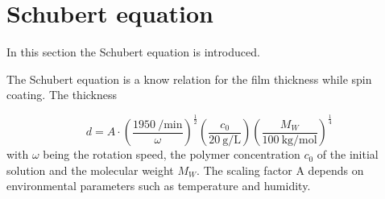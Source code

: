 \section{Schubert equation}
\label{sec:Schubert}

In this section the Schubert equation is introduced. 

The Schubert equation is a know relation for the film thickness while spin coating. The thickness 

\begin{equation}
    d = A \cdot (\frac{\SI{1950}{\per\minute}}{\omega})^\frac{1}{2} (\frac{c_0}{\SI{20}{\gram\per\liter}})(\frac{M_W}{\SI{100}{\kilo\gram\per \mol}})^\frac{1}{4}
\end{equation}
 with $\omega$ being the rotation speed, the polymer concentration $c_0$ of the initial solution and
 the molecular weight $M_W$. The scaling factor A depends on environmental parameters such as
 temperature and humidity.

